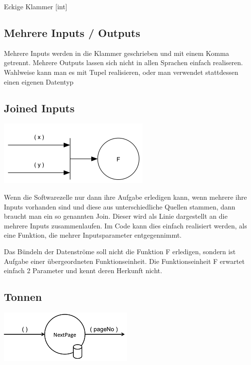 \documentclass[11pt]{article}
\begin{document}
Eckige Klammer
[int]

\subsection{Mehrere Inputs / Outputs}
\label{sec:orgheadline12}
Mehrere Inputs werden in die Klammer geschrieben und mit einem Komma getrennt.
Mehrere Outputs lassen sich nicht in allen Sprachen einfach realiseren.
Wahlweise kann man es mit Tupel realisieren, oder man verwendet stattdessen einen eigenen Datentyp

\subsection{Joined Inputs}
\label{sec:orgheadline13}

\includegraphics[width=.9\linewidth]{./img/diagramJoin.png}

Wenn die Softwarezelle nur dann ihre Aufgabe erledigen kann, wenn mehrere ihre Inputs 
vorhanden sind und diese aus unterschiedliche Quellen stammen, dann braucht man ein so genannten Join.
Dieser wird als Linie dargestellt an die mehrere Inputs zusammenlaufen.
Im Code kann dies einfach realisiert werden, als eine Funktion, die mehrer Inputsparameter entgegennimmt.

Das Bündeln der Datenströme soll nicht die Funktion F erledigen, sondern ist Aufgabe einer übergeordneten Funktionseinheit.
Die Funktionseinheit F erwartet einfach 2 Parameter und kennt deren Herkunft nicht. 

\subsection{Tonnen}
\label{sec:orgheadline14}

\includegraphics[width=.9\linewidth]{./img/diagramTonne.png}
\end{document}
